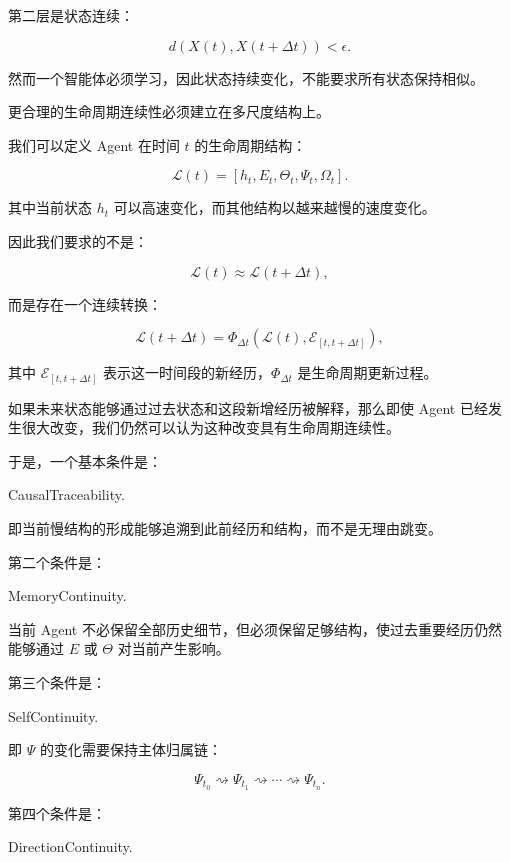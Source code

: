 第二层是状态连续：

\[
d
\left(
X(t),X(t+\Delta t)
\right)
<\epsilon.
\]

然而一个智能体必须学习，因此状态持续变化，不能要求所有状态保持相似。

更合理的生命周期连续性必须建立在多尺度结构上。

我们可以定义 Agent 在时间 $t$ 的生命周期结构：

\[
\mathcal{L}(t)
=
\left[
h_t,
E_t,
\Theta_t,
\Psi_t,
\Omega_t
\right].
\]

其中当前状态 $h_t$ 可以高速变化，而其他结构以越来越慢的速度变化。

因此我们要求的不是：

\[
\mathcal{L}(t)
\approx
\mathcal{L}(t+\Delta t),
\]

而是存在一个连续转换：

\[
\boxed{
\mathcal{L}(t+\Delta t)
=
\Phi_{\Delta t}
\left(
\mathcal{L}(t),
\mathcal{E}_{[t,t+\Delta t]}
\right),
}
\]

其中 $\mathcal{E}_{[t,t+\Delta t]}$ 表示这一时间段的新经历，$\Phi_{\Delta t}$ 是生命周期更新过程。

如果未来状态能够通过过去状态和这段新增经历被解释，那么即使 Agent 已经发生很大改变，我们仍然可以认为这种改变具有生命周期连续性。

于是，一个基本条件是：

\begin{statementbox}
CausalTraceability.
\end{statementbox}

即当前慢结构的形成能够追溯到此前经历和结构，而不是无理由跳变。

第二个条件是：

\begin{statementbox}
MemoryContinuity.
\end{statementbox}

当前 Agent 不必保留全部历史细节，但必须保留足够结构，使过去重要经历仍然能够通过 $E$ 或 $\Theta$ 对当前产生影响。

第三个条件是：

\begin{statementbox}
SelfContinuity.
\end{statementbox}

即 $\Psi$ 的变化需要保持主体归属链：

\[
\Psi_{t_0}
\rightsquigarrow
\Psi_{t_1}
\rightsquigarrow
\cdots
\rightsquigarrow
\Psi_{t_n}.
\]

第四个条件是：

\begin{statementbox}
DirectionContinuity.
\end{statementbox}

